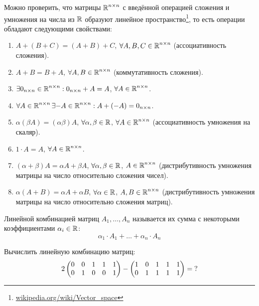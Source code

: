 \documentclass[a4paper,12pt]{article}
\begin{document}
  \begin{remark}
    Можно проверить, что матрицы $\operatorname{\mathbb R}^{n \times n}$ с введённой операцией сложения и умножения на числа из $\operatorname{\mathbb R}$ образуют линейное пространство\footnote{\href{https://en.wikipedia.org/wiki/Vector\_space}{wikipedia.org/wiki/Vector\_space}}, то есть операции обладают следующими свойствами:
    \begin{enumerate}
      \item $A + (B + C) = (A + B) + C$, $\forall A, B, C \in \operatorname{\mathbb R}^{n \times n}$ (ассоциативность сложения).
      \item $A + B = B + A$, $\forall A, B \in \operatorname{\mathbb R}^{n \times n}$ (коммутативность сложения).
      \item $\exists 0_{n\times n} \in \operatorname{\mathbb R}^{n \times n}: 0_{n\times n} + A = A$, $\forall A \hm\in \RR^{n \times n}$.
      \item $\forall A \in \operatorname{\mathbb R}^{n \times n} \exists {-A} \in \operatorname{\mathbb R}^{n \times n}: A + ({-A}) = 0_{n\times n}$.
      \item $\alpha (\beta A) = (\alpha \beta) A$, $\forall \alpha, \beta \in \operatorname{\mathbb R}$, $\forall A \hm\in \RR^{n \times n}$ (ассоциативность умножения на скаляр).
      \item $1 \cdot A = A$, $\forall A \in \operatorname{\mathbb R}^{n \times n}$.
      \item $(\alpha + \beta) A = \alpha A + \beta A$, $\forall \alpha, \beta \hm\in \RR$, $A \hm\in \RR^{n \times n}$ (дистрибутивность умножения матрицы на число относительно сложения чисел).
      \item $\alpha (A + B) = \alpha A + \alpha B$, $\forall \alpha \hm\in \RR$, $A, B \hm\in \RR^{n \times n}$ (дистрибутивность умножения матрицы на число относительно сложения матриц).
    \end{enumerate}
  \end{remark}
  
  \begin{definition}
    Линейной комбинацией матриц $A_1, \ldots, A_n$ называется их сумма с некоторыми коэффициентами $\alpha_i \hm\in \RR$:
    \[
      \alpha_1 \cdot A_1 + \ldots + \alpha_n \cdot A_n
    \]
  \end{definition}
  
  
  \begin{problem}[15.2(6)]
    Вычислить линейную комбинацию матриц:
    \[
      2 \begin{pmatrix}
        0 & 0 & 1 & 1 & 1\\
        0 & 1 & 0 & 0 & 1
      \end{pmatrix}
      - \begin{pmatrix}
        1 & 0 & 1 & 1 & 1\\
        0 & 1 & 1 & 1 & 1
      \end{pmatrix} = \operatorname{?}
    \]
  \end{problem}
  
\end{document}

